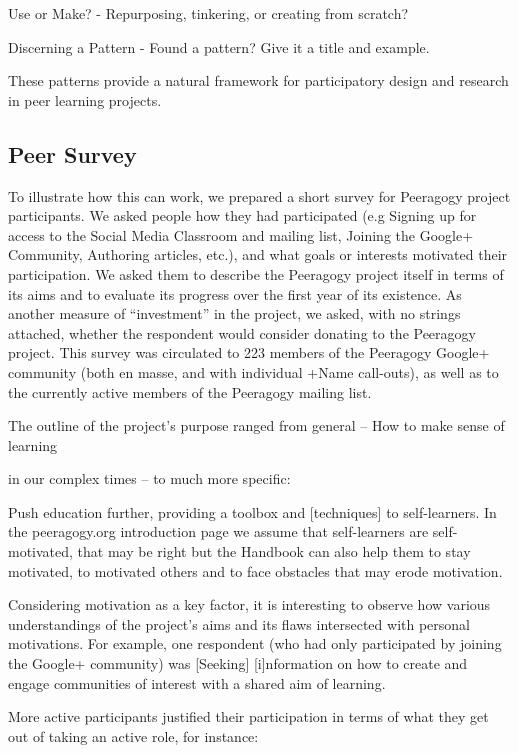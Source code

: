 \documentclass[twoside]{article}
\begin{document}
\begin{multicols}{2}
    Use or Make? - Repurposing, tinkering, or creating from scratch?

    Discerning a Pattern - Found a pattern? Give it a title and example.


These patterns provide a natural framework for participatory design and research in peer learning projects.

\subsection{Peer Survey}

To illustrate how this can work, we prepared a short survey for Peeragogy project participants. We asked people how they had participated (e.g Signing up for access to the Social Media Classroom and mailing list, Joining the Google+ Community, Authoring articles, etc.), and what goals or interests motivated their participation. We asked them to describe the Peeragogy project itself in terms of its aims and to evaluate its progress over the first year of its existence. As another measure of ``investment'' in the project, we asked, with no strings attached, whether the respondent would consider donating to the Peeragogy project. This survey was circulated to 223 members of the Peeragogy Google+ community (both en masse, and with individual +Name call-outs), as well as to the currently active members of the Peeragogy mailing list.

The outline of the project's purpose ranged from general -- How to make sense of learning

in our complex times -- to much more specific:

Push education further, providing a toolbox and [techniques] to self-learners. In the peeragogy.org introduction page we assume that self-learners are self-motivated, that may be right but the Handbook can also help them to stay motivated, to motivated others and to face obstacles that may erode motivation.

Considering motivation as a key factor, it is interesting to observe how various understandings of the project's aims and its flaws intersected with personal motivations. For example, one respondent (who had only participated by joining the Google+ community) was [Seeking] [i]nformation on how to create and engage communities of interest with a shared aim of learning.

More active participants justified their participation in terms of what they get out of taking an active role, for instance:


\end{multicols}
\end{document}
